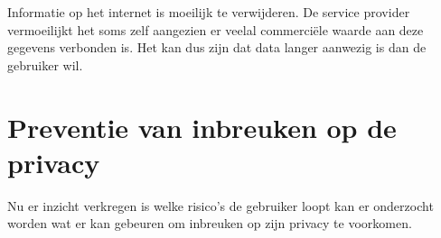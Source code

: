 Informatie op het internet is moeilijk te verwijderen. De service provider vermoeilijkt het soms zelf aangezien er veelal commerci\"ele waarde aan deze gegevens verbonden is. Het kan dus zijn dat data langer aanwezig is dan de gebruiker wil.

\section{Preventie van inbreuken op de privacy}
Nu er inzicht verkregen is welke risico's de gebruiker loopt kan er onderzocht worden wat er kan  gebeuren om inbreuken op zijn privacy te voorkomen.






